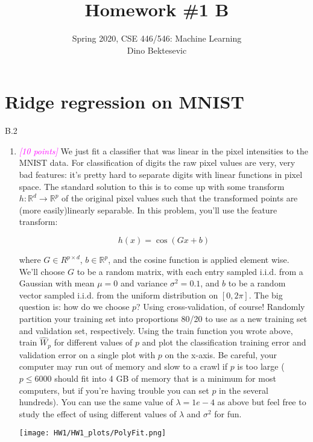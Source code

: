 \documentclass{article}
\date{{}}
\newcommand{\field}[1]{\mathbb{#1}}
\newcommand{\1}{\mathbf{1}}
\newcommand{\R}{\field{R}} %
\newcommand{\points}[1]{\small\textcolor{magenta}{\emph{[#1 points]}} \normalsize}
\begin{document}
\title{Homework \#1 B}
\author{\normalsize{Spring 2020, CSE 446/546: Machine Learning}\\
\normalsize{Dino Bektesevic}}
\maketitle

\section*{Ridge regression on MNIST}
B.2 
\begin{enumerate}
    \item \points{10} We just fit a classifier that was linear in the pixel intensities to the MNIST data. For classification of digits the raw pixel values are very, very bad features: it’s pretty hard to separate digits with linear functions in pixel space. The standard solution to this is to come up with some transform $h:\R^d\rightarrow \R^p$ of the original pixel values such that the transformed points are (more easily)linearly separable. In this problem, you’ll use the feature transform:
    
    $$h(x) = \cos(Gx+b)$$
    
    where $G\in R^{p\times d}$, $b\in \R^p$, and the cosine function is applied element wise. We’ll choose $G$ to be a random matrix, with each entry sampled i.i.d. from a Gaussian with mean $\mu = 0$ and variance $\sigma^2=0.1$, and $b$ to be a random vector sampled i.i.d. from the uniform distribution on $[0, 2\pi]$. The big question is: how do we choose $p$? Using cross-validation, of course! Randomly partition your training set into proportions 80/20 to use as a new training set and validation set, respectively. Using the train function you wrote above, train $\widehat W_p$ for different values of $p$ and plot the classification training error and validation error on a single plot with $p$ on the x-axis. Be careful, your computer may run out of memory and slow to a crawl if $p$ is too large ($p\leq 6000$ should fit into 4 GB of memory that is a minimum for most computers, but if you’re having trouble you can set $p$ in the several hundreds). You can use the same value of $\lambda = 1e-4$ as above but feel free to study the effect of using different values of $\lambda$ and $\sigma^2$ for fun.
    
    \begin{center}
    \texttt{[image: HW1/HW1\_plots/PolyFit.png]}
    \end{center}    
    

\end{enumerate}
\end{document}
